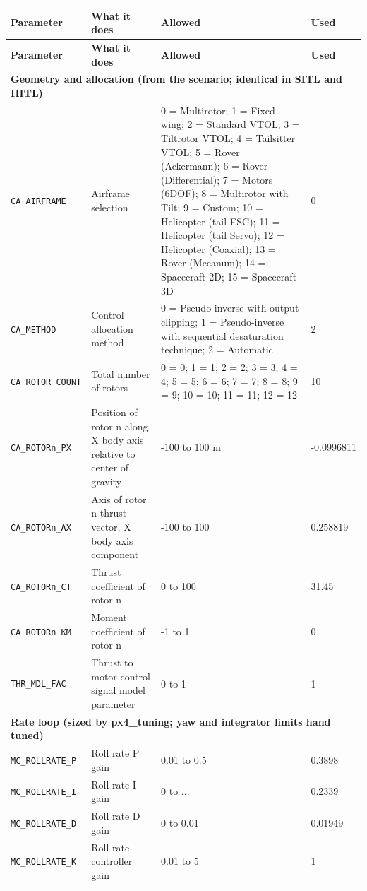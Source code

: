 \documentclass[11pt,a4paper]{article}
\newcommand{\param}[1]{\texttt{#1}}
\begin{document}
{\small
\begin{longtable}{@{}p{3.3cm}p{5.6cm}p{3.6cm}p{1.9cm}@{}}
\toprule
\textbf{Parameter} & \textbf{What it does} & \textbf{Allowed} & \textbf{Used} \\
\midrule
\endfirsthead
\toprule
\textbf{Parameter} & \textbf{What it does} & \textbf{Allowed} & \textbf{Used} \\
\midrule
\endhead
\midrule
\multicolumn{4}{l}{\textbf{Geometry and allocation (from the scenario; identical in SITL and HITL)}} \\
\midrule
\param{CA\_AIRFRAME} & Airframe selection & 0 = Multirotor; 1 = Fixed-wing; 2 = Standard VTOL; 3 = Tiltrotor VTOL; 4 = Tailsitter VTOL; 5 = Rover (Ackermann); 6 = Rover (Differential); 7 = Motors (6DOF); 8 = Multirotor with Tilt; 9 = Custom; 10 = Helicopter (tail ESC); 11 = Helicopter (tail Servo); 12 = Helicopter (Coaxial); 13 = Rover (Mecanum); 14 = Spacecraft 2D; 15 = Spacecraft 3D & 0 \\
\param{CA\_METHOD} & Control allocation method & 0 = Pseudo-inverse with output clipping; 1 = Pseudo-inverse with sequential desaturation technique; 2 = Automatic & 2 \\
\param{CA\_ROTOR\_COUNT} & Total number of rotors & 0 = 0; 1 = 1; 2 = 2; 3 = 3; 4 = 4; 5 = 5; 6 = 6; 7 = 7; 8 = 8; 9 = 9; 10 = 10; 11 = 11; 12 = 12 & 10 \\
\param{CA\_ROTORn\_PX} & Position of rotor n along X body axis relative to center of gravity & -100 to 100 m & -0.0996811 \\
\param{CA\_ROTORn\_AX} & Axis of rotor n thrust vector, X body axis component & -100 to 100 & 0.258819 \\
\param{CA\_ROTORn\_CT} & Thrust coefficient of rotor n & 0 to 100 & 31.45 \\
\param{CA\_ROTORn\_KM} & Moment coefficient of rotor n & -1 to 1 & 0 \\
\param{THR\_MDL\_FAC} & Thrust to motor control signal model parameter & 0 to 1 & 1 \\
\midrule
\multicolumn{4}{l}{\textbf{Rate loop (sized by px4\_tuning; yaw and integrator limits hand tuned)}} \\
\midrule
\param{MC\_ROLLRATE\_P} & Roll rate P gain & 0.01 to 0.5 & 0.3898 \\
\param{MC\_ROLLRATE\_I} & Roll rate I gain & 0 to ... & 0.2339 \\
\param{MC\_ROLLRATE\_D} & Roll rate D gain & 0 to 0.01 & 0.01949 \\
\param{MC\_ROLLRATE\_K} & Roll rate controller gain & 0.01 to 5 & 1 \\

\end{longtable}}
\end{document}
